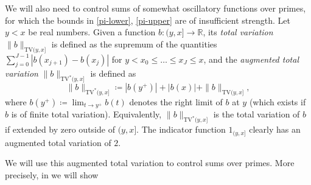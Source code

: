 \documentclass[12pt,a4paper,reqno]{amsart}
\numberwithin{equation}{section}
\theoremstyle{plain}
\theoremstyle{definition}
\newcommand\R{\mathbb{R}}
\begin{document}
We will also need to control sums of somewhat oscillatory functions over primes, for which the bounds in \eqref{pi-lower}, \eqref{pi-upper} are of insufficient strength. Let $y<x$ be real numbers. Given a function $b \colon (y,x] \to \R$, its \emph{total variation}
$\|b\|_{\mathrm{TV}(y,x]}$ is defined as the supremum of the quantities $\sum_{j=0}^{J-1} |b(x_{j+1})-b(x_j)|$ for $y < x_0 \leq \dots \leq x_J \leq x$, and the \emph{augmented total variation} $\|b\|_{\mathrm{TV}^*(y,x]}$ is defined as
$$
\|b\|_{\mathrm{TV}^*(y,x]}
\coloneqq |b(y^+)| + |b(x)| + \|b\|_{\mathrm{TV}(y,x]},$$
where $b(y^+) \coloneqq \lim_{t \to y^+} b(t)$ denotes the right limit of $b$ at $y$ (which exists if $b$ is of finite total variation).  Equivalently, $\|b\|_{\mathrm{TV}^*(y,x]}$ is the total variation of $b$ if extended by zero outside of $(y,x]$. The indicator function $1_{(y,x]}$ clearly has an augmented total variation of $2$.

We will use this augmented total variation to control sums over primes.  More precisely, in  we will show
\end{document}
